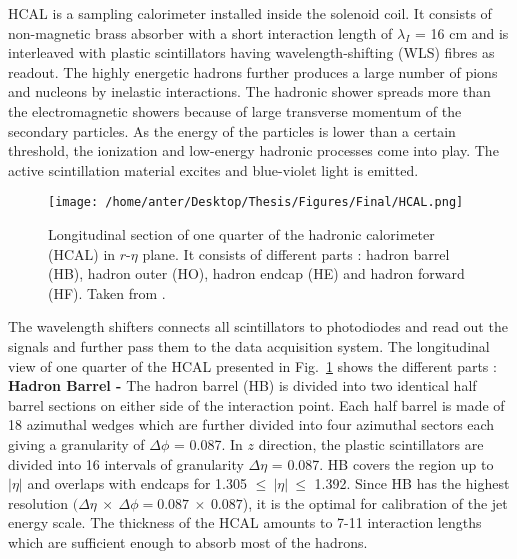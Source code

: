 HCAL is a sampling calorimeter installed inside the solenoid coil. It consists of non-magnetic brass absorber with a short interaction length of $\lambda_I$ = 16 cm and is interleaved with plastic scintillators having wavelength-shifting (WLS) fibres as readout. The highly energetic hadrons further produces a large number of pions and nucleons by inelastic interactions. The hadronic shower spreads more than the electromagnetic showers because of large transverse momentum of the secondary particles. As the energy of the particles is lower than a certain threshold, the ionization and low-energy hadronic processes come into play. The active scintillation material excites and blue-violet light is emitted. 
\begin{figure}[!h]
\begin{center}
\vspace*{3mm} 
\hspace*{-5mm}
\texttt{[image: /home/anter/Desktop/Thesis/Figures/Final/HCAL.png]}\\
\vspace*{4mm}
\caption[Longitudinal section of one quarter of the hadronic calorimeter (HCAL) in $r$-$\eta$ plane.]{Longitudinal section of one quarter of the hadronic calorimeter (HCAL) in $r$-$\eta$ plane. It consists of different parts : hadron barrel (HB), hadron outer (HO), hadron endcap (HE) and hadron forward (HF). Taken from \cite{Chatrchyan:2008aa}.}
\label{fig:hcal}
\end{center}
\end{figure}
The wavelength shifters connects all scintillators to photodiodes and read out the signals and further pass them to the data acquisition system. The longitudinal view of one quarter of the HCAL presented in Fig.~\ref{fig:hcal} shows the different parts : \\\newline
{\bf Hadron Barrel -} The hadron barrel (HB) is divided into two identical half barrel sections on either side of the interaction point. Each half barrel is made of 18 azimuthal wedges which are further divided into four azimuthal sectors each giving a granularity of $\Delta\phi$ = 0.087. In $z$ direction, the plastic scintillators are divided into 16 intervals of granularity $\Delta\eta$ = 0.087. HB covers the region up to $|\eta|$  and overlaps with endcaps for 1.305 $\leq~|\eta|~\leq$ 1.392. Since HB has the highest resolution $(\Delta\eta~\times~\Delta\phi = 0.087~\times~0.087$), it is the optimal for calibration of the jet energy scale. The thickness of the HCAL amounts to 7-11 interaction lengths which are sufficient enough to absorb most of the hadrons.\\\newline
